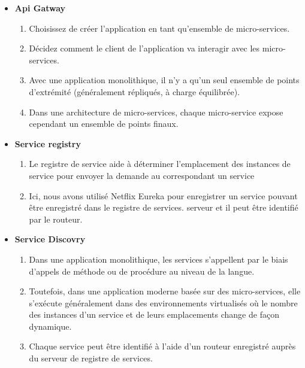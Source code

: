 \begin{itemize}
\item  \textbf{Api Gatway }


\begin{enumerate}
	
\item 	  Choisissez de créer l’application en tant qu’ensemble de micro-services.

\item	  Décidez comment le client de l'application va interagir avec les micro-services.

\item	  Avec une application monolithique, il n'y a qu'un seul ensemble de points d'extrémité (généralement répliqués, à charge équilibrée).

\item	  Dans une architecture de micro-services, chaque micro-service expose cependant un ensemble de
points finaux.
\end{enumerate}


\item \textbf{Service registry}

\begin{enumerate}
\item 	  Le registre de service aide à déterminer l’emplacement des instances de service pour envoyer la demande au correspondant
	un service
	
\item 	  Ici, nous avons utilisé Netflix Eureka pour enregistrer un service pouvant être enregistré dans le registre de services.
	serveur et il peut être identifié par le routeur.

	
\end{enumerate}
\item \textbf{Service Discovry}
\begin{enumerate}


\item   Dans une application monolithique, les services s'appellent par le biais d'appels de méthode ou de procédure au niveau de la langue.

\item   Toutefois, dans une application moderne basée sur des micro-services, elle s'exécute généralement dans des environnements virtualisés où le nombre
des instances d'un service et de leurs emplacements change de façon dynamique.

\item   Chaque service peut être identifié à l'aide d'un routeur enregistré auprès du serveur de registre de services.
	
\end{enumerate}
\end{itemize}






